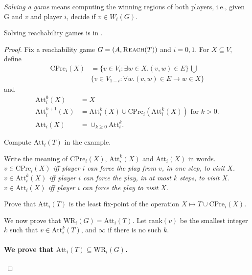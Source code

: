 \documentclass[a4paper,10pt]{article}
\newcommand{\reach}[1]{\textsc{Reach}(#1)}
\newcommand{\cpre}{\textrm{CPre}}
\newcommand{\rank}{\textrm{rank}}
\newcommand{\WR}{\textrm{WR}}
\newcommand{\att}{\textrm{Att}}
\begin{document}
\begin{definition}
\emph{Solving a game} means computing the winning regions of both players, i.e., given G and $v$ and player $i$, decide if $v \in 
W_i(G)$.
\end{definition}


\begin{theorem}
 Solving reachability games is in \ptime. 
\end{theorem}

\begin{proof}
Fix a reachability game $G = (A,\reach{T})$ and $i = 0,1$. For $X \subseteq V$, define 
\begin{align*}
\cpre_i(X) & =  \{v \in V_i : \exists w \in X. (v,w) \in E\} \, \bigcup \\
&
\{v \in V_{1-i} : \forall w. (v,w) \in E \to w \in X\}
\end{align*}
and 
\begin{align*}
\att_i^0(X) &= X\\ 
\att_i^{k+1}(X) &= \att_i^k(X) \cup \cpre_i(\att_i^k(X)) \mbox{ for } k > 0.\\
\att_i(X) &=\cup_{k \geq 0} \att_i^k.
\end{align*}



\begin{question}
 Compute $\att_i(T)$ in the example. 
\end{question}

\begin{question} 
 Write the meaning of $\cpre_i(X)$, $\att_i^k(X)$ and $\att_i(X)$ in words.
 \it
 \- $v \in \cpre_i(X)$ iff player $i$ can force the play from $v$, in one step, to visit $X$.
 \- $v \in \att_i^k(X)$ iff player $i$ can force the play, in at most $k$ steps, to visit $X$. 
 \- $v \in \att_i(X)$ iff player $i$ can force the play to visit $X$. 
 \ti
\end{question}

\begin{question}
 Prove that $\att_i(T)$ is the least fix-point of the operation $X \mapsto T \cup \cpre_i(X)$.
\end{question}

We now prove that $\WR_i(G) = \att_i(T)$.  Let $\rank(v)$ be the smallest integer $k$ such that $v \in \att_i^k(T)$, and $\infty$ if there is no such $k$.

\paragraph{We prove that $\att_i(T) \subseteq \WR_i(G)$.}


\end{proof}
\end{document}
